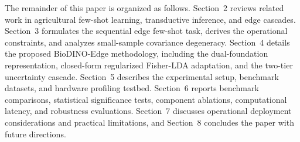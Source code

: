 The remainder of this paper is organized as follows. Section~2 reviews related work in agricultural few-shot learning, transductive inference, and edge cascades. Section~3 formulates the sequential edge few-shot task, derives the operational constraints, and analyzes small-sample covariance degeneracy. Section~4 details the proposed BioDINO-Edge methodology, including the dual-foundation representation, closed-form regularized Fisher-LDA adaptation, and the two-tier uncertainty cascade. Section~5 describes the experimental setup, benchmark datasets, and hardware profiling testbed. Section~6 reports benchmark comparisons, statistical significance tests, component ablations, computational latency, and robustness evaluations. Section~7 discusses operational deployment considerations and practical limitations, and Section~8 concludes the paper with future directions.
